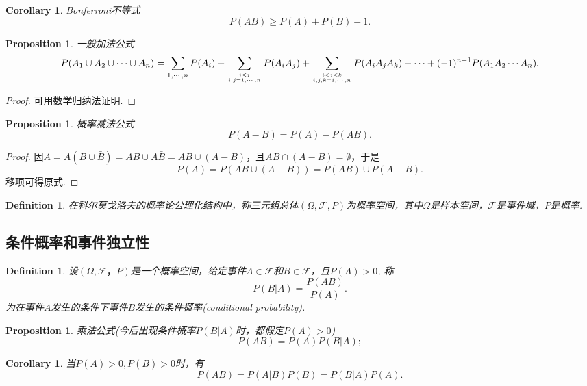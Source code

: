 \documentclass{article}
\newtheorem{corollary}[theorem]{Corollary}
\newtheorem{proposition}[theorem]{Proposition}
\newtheorem{definition}[theorem]{Definition}
\begin{document}
\begin{corollary}
\rm Bonferroni不等式
$$
P(AB) \geq P(A) + P(B) -1.
$$
\end{corollary}

\begin{proposition}
\rm 一般加法公式
$$
P(A_1 \cup A_2 \cup \cdots \cup A_n) = \sum\limits_{1,\cdots,n} P(A_i) - \sum\limits_{i < j \atop i,j = 1,\cdots,n}P(A_iA_j) +  \sum\limits_{i < j < k \atop i,j,k = 1,\cdots,n}P(A_iA_jA_k) - \cdots + (-1)^{n-1}P(A_1A_2\cdots A_n). 
$$
\end{proposition}

\begin{proof}
可用数学归纳法证明. 
\end{proof}

\begin{proposition}
\rm 概率减法公式 
$$
P(A - B) = P(A) - P(AB).
$$
\end{proposition}

\begin{proof}
因$A = A(B \cup \bar{B}) = AB \cup A\bar{B} = AB \cup (A-B)$，且$AB \cap (A-B) = \emptyset$，于是
$$
P(A) = P(AB \cup (A-B)) = P(AB) \cup P(A-B). 
$$
移项可得原式. 
\end{proof}

\begin{definition}
\rm 在科尔莫戈洛夫的概率论公理化结构中，称三元组总体$(\Omega,\mathscr{F}, P)$为{\color{red}概率空间}，其中$\Omega$是样本空间，$\mathscr{F}$是事件域，$P$是概率. 
\end{definition}



\newpage
\subsection{条件概率和事件独立性}

\begin{definition}
\rm 设$(\Omega,\mathscr{F}，P)$是一个概率空间，给定事件$A \in \mathscr{F}$和$B \in \mathscr{F}$，且$P(A) > 0$, 称
$$
P(B|A) = \frac{P(AB)}{P(A)}.
$$
为在事件$A$发生的条件下事件$B$发生的{\color{red}条件概率}(conditional probability).
\end{definition}

\begin{proposition}
\rm 乘法公式(今后出现条件概率$P(B|A)$时，都假定$P(A) > 0$)
$$
P(AB) = P(A)P(B|A);
$$
\end{proposition}

\begin{corollary}
\rm 当$P(A) > 0,P(B) > 0$时，有
$$
P(AB) = P(A|B)P(B) = P(B|A)P(A).
$$
\end{corollary}
\end{document}
